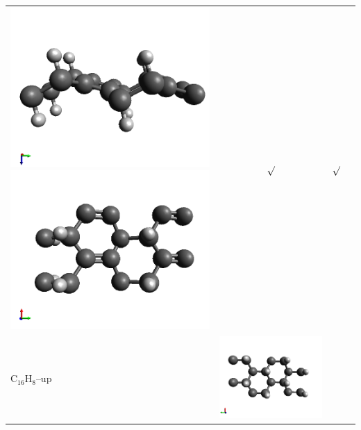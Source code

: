 \documentclass[11pt]{article}
\begin{document}
\begin{table}[h!]
\begin{tabular}[b]{ l c c c }
	\includegraphics[width=0.12\tw]{../structures_figures/c16h8_alt1.png} 
	\includegraphics[width=0.12\tw]{../structures_figures/c16h8_alt2.png} &
	{ $\surd$} & { $\surd$} \\
	{ C$_{16}$H$_{8}$--up} & 	
	\includegraphics[width=0.12\tw]{../structures_figures/c16h8_up-structure1.png} 

\end{tabular}
\end{table}
\end{document}
